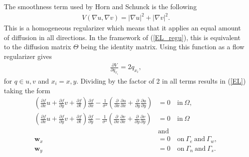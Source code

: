 \documentclass[10pt,a4paper]{article}
\begin{document}
The smoothness term used by Horn and Schunck is the following
\begin{align*}
V(\nabla u, \nabla v) = |\nabla u|^2 + |\nabla v|^2.
\end{align*}
This is a homogeneous regularizer which means that it applies an equal amount of diffusion in all directions. In the framework of (\ref{EL_regu}), this is equivalent to the diffusion matrix $\Theta$ being the identity matrix. Using this function as a flow regularizer gives
\begin{align*}
\frac{\partial V}{\partial q_{x_i}} = 2q_{x_i},
\end{align*}
for $q \in u,v$ and $x_i = x, y$. Dividing by the factor of 2 in all terms results in (\ref{EL}) taking the form 
\begin{equation}
\label{EL_HS}
\begin{aligned}
(\frac{\partial f}{\partial x}u + \frac{\partial f}{\partial y}v + \frac{\partial f}{\partial t}) \frac{\partial f}{\partial x} - \frac{1}{\sigma^2}(\frac{\partial}{\partial x} \frac{\partial u}{\partial x} + \frac{\partial}{\partial y} \frac{\partial u}{\partial y} ) &= 0  \quad \text{in} \ \Omega,  \\
(\frac{\partial f}{\partial x}u + \frac{\partial f}{\partial y}v + \frac{\partial f}{\partial t}) \frac{\partial f}{\partial y} - \frac{1}{\sigma^2}(\frac{\partial}{\partial x} \frac{\partial v}{\partial x} + \frac{\partial}{\partial y} \frac{\partial v}{\partial y} ) &= 0  \quad \text{in} \ \Omega  \\
& \text{and} \\
\textbf{w}_{x} &= 0 \quad \text{on} \ \Gamma_e \ \text{and} \ \Gamma_w, \\
\textbf{w}_{y} &= 0 \quad \text{on} \ \Gamma_n \ \text{and} \ \Gamma_s.
\end{aligned}
\end{equation}
\end{document}
